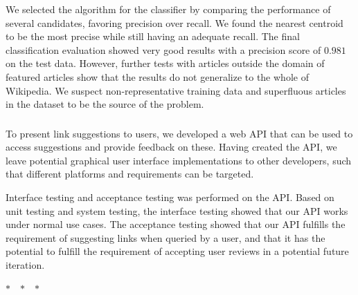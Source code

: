 

We selected the algorithm for the classifier by comparing the performance of several candidates, favoring precision over recall. We found the nearest centroid to be the most precise while still having an adequate recall.
The final classification evaluation showed very good results with a precision score of $0.981$ on the test data. However, further tests with articles outside the domain of featured articles show that the results do not generalize to the whole of Wikipedia. We suspect non-representative training data and superfluous articles in the dataset to be the source of the problem.

\subsubsection*{\subproblemthree}

To present link suggestions to users, we developed a web API that can be used to access suggestions and provide feedback on these. Having created the API, we leave potential graphical user interface implementations to other developers, such that different platforms and requirements can be targeted.

Interface testing and acceptance testing was performed on the API\@. Based on unit testing and system testing, the interface testing showed that our API works under normal use cases. The acceptance testing showed that our API fulfills the requirement of suggesting links when queried by a user, and that it has the potential to fulfill the requirement of accepting user reviews in a potential future iteration.

\begin{center}
  $\ast$~~$\ast$~~$\ast$
\end{center}

